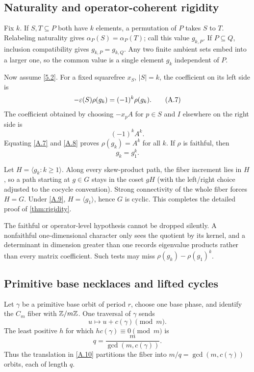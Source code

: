 \subsection{Naturality and operator-coherent rigidity}
\label{app:proof-rigidity}

Fix \(k\).  If \(S,T\subseteq P\) both have \(k\) elements, a permutation of
\(P\) takes \(S\) to \(T\).  Relabeling naturality gives
\(\alpha_P(S)=\alpha_P(T)\); call this value \(g_{k,P}\).
If \(P\subseteq Q\), inclusion compatibility gives
\(g_{k,P}=g_{k,Q}\).  Any two finite ambient sets embed into a larger one, so
the common value is a single element \(g_k\) independent of \(P\).

Now assume \eqref{5.2}.  For a fixed squarefree \(x_S\), \(|S|=k\), the
coefficient on its left side is
\[
-\varepsilon(S)\rho(g_k)=(-1)^k\rho(g_k).
\tag{A.7}\label{A.7}
\]
The coefficient obtained by choosing \(-x_pA\) for \(p\in S\) and \(I\)
elsewhere on the right side is
\[
(-1)^kA^k.
\tag{A.8}\label{A.8}
\]
Equating \eqref{A.7} and \eqref{A.8} proves
\(\rho(g_k)=A^k\) for all \(k\).  If \(\rho\) is faithful, then
\[
g_k=g_1^k.
\tag{A.9}\label{A.9}
\]

Let \(H=\langle g_k:k\ge1\rangle\).  Along every skew-product path, the fiber
increment lies in \(H\), so a path starting at \(g\in G\) stays in the coset
\(gH\) (with the left/right choice adjusted to the cocycle convention).
Strong connectivity of the whole fiber forces \(H=G\).  Under \eqref{A.9},
\(H=\langle g_1\rangle\), hence \(G\) is cyclic.  This completes the detailed
proof of \cref{thm:rigidity}.

The faithful or operator-level hypothesis cannot be dropped silently.  A
nonfaithful one-dimensional character only sees the quotient by its kernel,
and a determinant in dimension greater than one records eigenvalue products
rather than every matrix coefficient.  Such tests may miss
\(\rho(g_k)-\rho(g_1)^k\).

\subsection{Primitive base necklaces and lifted cycles}
\label{app:proof-lifts}

Let \(\gamma\) be a primitive base orbit of period \(r\), choose one base
phase, and identify the \(C_m\) fiber with \(\mathbb Z/m\mathbb Z\).  One traversal of
\(\gamma\) sends
\[
u\longmapsto u+c(\gamma)\pmod m.
\tag{A.10}\label{A.10}
\]
The least positive \(h\) for which \(hc(\gamma)\equiv0\pmod m\) is
\[
q=\frac{m}{\gcd(m,c(\gamma))}.
\tag{A.11}\label{A.11}
\]
Thus the translation in \eqref{A.10} partitions the fiber into
\(m/q=\gcd(m,c(\gamma))\) orbits, each of length \(q\).

